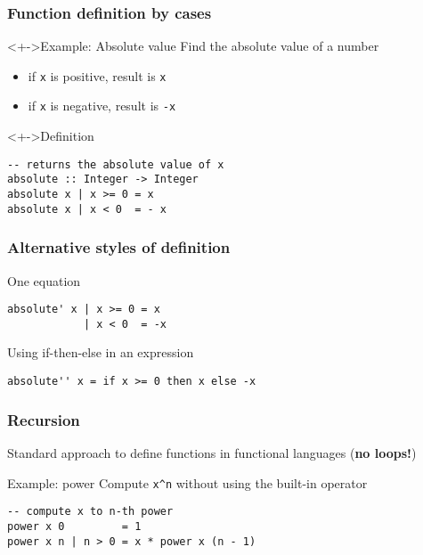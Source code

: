 \documentclass{beamer}
\subtitle{Functions}
\begin{document}
\begin{frame}
  \titlepage
\end{frame}
\begin{frame}[fragile]
  \frametitle{Function definition by cases}
  \begin{block}<+->{Example: Absolute value}
    Find the absolute value of a number
    \begin{itemize}
    \item if \lstinline{x} is positive, result is \lstinline{x}
    \item if \lstinline{x} is negative, result is \lstinline{-x}
    \end{itemize}
  \end{block}
  \begin{block}<+->{Definition}
\begin{lstlisting}
-- returns the absolute value of x
absolute :: Integer -> Integer
absolute x | x >= 0 = x
absolute x | x < 0  = - x
\end{lstlisting}
  \end{block}
\end{frame}

\begin{frame}
  \frametitle{Alternative styles of definition}
  
  \begin{block}{One equation}
\begin{lstlisting}
absolute' x | x >= 0 = x
            | x < 0  = -x
\end{lstlisting}
  \end{block}
  
  \begin{block}{Using if-then-else in an expression}
\begin{lstlisting}
absolute'' x = if x >= 0 then x else -x
\end{lstlisting}
  \end{block}
\end{frame}

\begin{frame}[fragile]
  \frametitle{Recursion}
  Standard approach to define functions in functional languages
  (\textbf{no loops!})

  \begin{block}{Example: power}
    Compute \lstinline|x^n| without using the built-in operator
\begin{lstlisting}
-- compute x to n-th power
power x 0         = 1
power x n | n > 0 = x * power x (n - 1)
\end{lstlisting}
  \end{block}
\end{frame}
\end{document}
